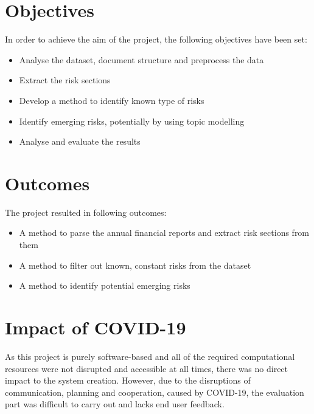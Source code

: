 \section{Objectives}
In order to achieve the aim of the project, the following objectives have been set:
\begin{itemize}
\item Analyse the dataset, document structure and preprocess the data
\item Extract the risk sections
\item Develop a method to identify known type of risks
\item Identify emerging risks, potentially by using topic modelling
\item Analyse and evaluate the results
\end{itemize}

\section{Outcomes}
The project resulted in following outcomes:
\begin{itemize}
\item A method to parse the annual financial reports and extract risk sections from them
\item A method to filter out known, constant risks from the dataset
\item A method to identify potential emerging risks
\end{itemize}

\section{Impact of COVID-19}
As this project is purely software-based and all of the required computational resources were not disrupted and accessible at all times, there was no direct impact to the system creation. However, due to the disruptions of communication, planning and cooperation, caused by COVID-19, the evaluation part was difficult to carry out and lacks end user feedback.